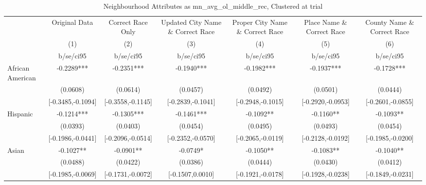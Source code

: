 \documentclass{article}
\begin{document}
\begin{table}[htbp]\centering
\def\sym#1{\ifmmode^{#1}\else\(^{#1}\)\fi}
\caption{Neighbourhood Attributes as mn\_avg\_ol\_middle\_rec, Clustered at trial}
\begin{tabular}{l*{6}{c}}
\toprule
                    &\multicolumn{1}{c}{Original Data}&\multicolumn{1}{c}{Correct Race Only}&\multicolumn{1}{c}{Updated City Name \& Correct Race}&\multicolumn{1}{c}{Proper City Name \& Correct Race}&\multicolumn{1}{c}{Place Name \& Correct Race}&\multicolumn{1}{c}{County Name \& Correct Race}\\\cmidrule(lr){2-2}\cmidrule(lr){3-3}\cmidrule(lr){4-4}\cmidrule(lr){5-5}\cmidrule(lr){6-6}\cmidrule(lr){7-7}
                    &\multicolumn{1}{c}{(1)}   &\multicolumn{1}{c}{(2)}   &\multicolumn{1}{c}{(3)}   &\multicolumn{1}{c}{(4)}   &\multicolumn{1}{c}{(5)}   &\multicolumn{1}{c}{(6)}   \\
                    &   b/se/ci95   &   b/se/ci95   &   b/se/ci95   &   b/se/ci95   &   b/se/ci95   &   b/se/ci95   \\
\midrule
African American    &     -0.2289***&     -0.2351***&     -0.1940***&     -0.1982***&     -0.1937***&     -0.1728***\\
                    &    (0.0608)   &    (0.0614)   &    (0.0457)   &    (0.0492)   &    (0.0501)   &    (0.0444)   \\
                    &[-0.3485,-0.1094]   &[-0.3558,-0.1145]   &[-0.2839,-0.1041]   &[-0.2948,-0.1015]   &[-0.2920,-0.0953]   &[-0.2601,-0.0855]   \\
Hispanic            &     -0.1214***&     -0.1305***&     -0.1461***&     -0.1092** &     -0.1160** &     -0.1093** \\
                    &    (0.0393)   &    (0.0403)   &    (0.0454)   &    (0.0495)   &    (0.0493)   &    (0.0454)   \\
                    &[-0.1986,-0.0441]   &[-0.2096,-0.0514]   &[-0.2352,-0.0570]   &[-0.2065,-0.0119]   &[-0.2128,-0.0192]   &[-0.1985,-0.0200]   \\
Asian               &     -0.1027** &     -0.0901** &     -0.0749*  &     -0.1050** &     -0.1083** &     -0.1040** \\
                    &    (0.0488)   &    (0.0422)   &    (0.0386)   &    (0.0444)   &    (0.0430)   &    (0.0412)   \\
                    &[-0.1985,-0.0069]   &[-0.1731,-0.0072]   &[-0.1507,0.0010]   &[-0.1921,-0.0178]   &[-0.1928,-0.0238]   &[-0.1849,-0.0231]   \\

\end{tabular}
\end{table}
\end{document}
